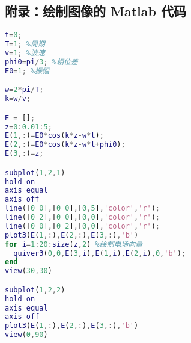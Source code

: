 \subsection{附录：绘制图像的 Matlab 代码}
\begin{lstlisting}[language=matlab]
t=0; 
T=1; %周期
v=1; %波速
phi0=pi/3; %相位差
E0=1; %振幅

w=2*pi/T;
k=w/v;

E = [];
z=0:0.01:5;
E(1,:)=E0*cos(k*z-w*t);
E(2,:)=E0*cos(k*z-w*t+phi0);
E(3,:)=z;

subplot(1,2,1)
hold on
axis equal
axis off
line([0 0],[0 0],[0,5],'color','r');
line([0 2],[0 0],[0,0],'color','r');
line([0 0],[0 2],[0,0],'color','r');
plot3(E(1,:),E(2,:),E(3,:),'b')
for i=1:20:size(z,2) %绘制电场向量
  quiver3(0,0,E(3,i),E(1,i),E(2,i),0,'b');
end
view(30,30)

subplot(1,2,2)
hold on
axis equal
axis off
plot3(E(1,:),E(2,:),E(3,:),'b')
view(0,90)

\end{lstlisting}
